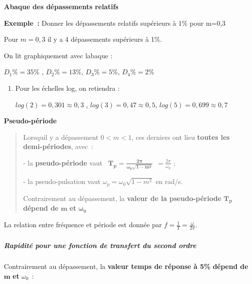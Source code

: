 \textbf{Abaque des dépassements relatifs}

\textbf{Exemple~:} Donner les dépassements relatifs supérieurs à 1\% pour m=0,3

Pour \(m = 0,3\) il y a 4 dépassements supérieurs à 1\%.

On lit graphiquement avec l\textquotesingle abaque :

\(D_{1}\% = 35\%\) , \(D_{2}\% = 13\%\), \(D_{3}\% = 5\%\), \(D_{4}\% = 2\%\)

\begin{enumerate}
\item
  Pour les échelles log, on retiendra :

  \(log(2) = 0,301 \approx 0,3\) , \(log(3) = 0,47 \approx 0,5\), \(log(5) = 0,699 \approx 0,7\)
\end{enumerate}

\textbf{Pseudo-période}

\begin{quote}
Lorsqu\textquotesingle il y a dépassement \(0\mathbf{<}m < 1\), ces derniers ont lieu \textbf{toutes les demi-périodes}, avec~:

- la \textbf{pseudo-période} vaut ~\(\mathbf{T}_{\mathbf{p}}\mathbf{=}\frac{\mathbf{2}\mathbf{\pi}}{\mathbf{\omega}_{\mathbf{0}}\sqrt{\mathbf{1 -}\mathbf{m}^{\mathbf{2}}}}\ \  = \frac{2\pi}{\omega_{p}}\) ;

- la pseudo-pulsation vaut \(\omega_{p} = \omega_{0}\sqrt{1 - m^{2}}\) en rad/s.

Contrairement au dépassement, la \textbf{valeur de la pseudo-période} \(\mathbf{T}_{\mathbf{p}}\) \textbf{dépend de} \(\mathbf{m}\) \textbf{et} \(\mathbf{\omega}_{\mathbf{0}}\)
\end{quote}

La relation entre fréquence et période est donnée par \(f = \frac{1}{T} = \frac{\omega}{2\pi}\).

\hypertarget{mod-section-12}{%
\subparagraph*{}\label{mod-section-12}}

\hypertarget{mod-rapidituxe9-pour-une-fonction-de-transfert-du-second-ordre}{%
\subparagraph*{Rapidité pour une fonction de transfert du second ordre}\label{mod-rapidituxe9-pour-une-fonction-de-transfert-du-second-ordre}}

Contrairement au dépassement, la \textbf{valeur temps de réponse à 5\%} \textbf{dépend de} \(\mathbf{m}\) \textbf{et} \(\omega_{0}\)~:

